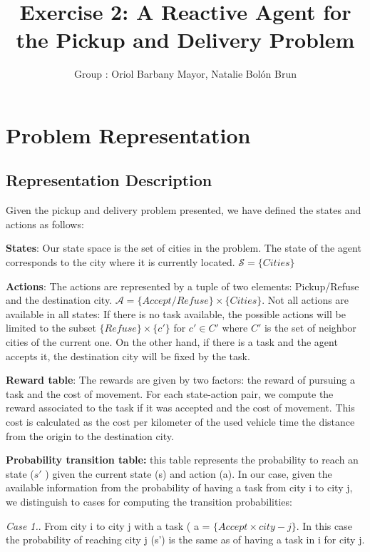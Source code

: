 \documentclass[11pt]{article}
\title{\bf Exercise 2: A Reactive Agent for the Pickup and Delivery Problem}
\author{Group \textnumero 54: Oriol Barbany Mayor, Natalie Bolón Brun}
\begin{document}
\maketitle

\section{Problem Representation}

\subsection{Representation Description}
 Given the pickup and delivery problem presented, we have defined the states and actions as follows: 
 
\textbf{States}: Our state space is the set of cities in the problem. The state of the agent corresponds to the city where it is currently located. $\mathcal{S} = \{ Cities \} $

\textbf{Actions}: The actions are represented by a tuple of two elements: Pickup/Refuse and the destination city.  $\mathcal{A} = \{Accept/Refuse\} \times \{ Cities \} $. Not all actions are available in all states: If there is no task available, the possible actions will be limited to the subset $\{Refuse\} \times \{c'\}$ for  $c' \in C'$ where $C'$ is the set of neighbor cities of the current one. On the other hand, if there is a task and the agent accepts it, the destination city will be fixed by the task. 

\textbf{Reward table}: The rewards are given by two factors: the reward of pursuing a task and the cost of movement. For each state-action pair, we compute the reward associated to the task if it was accepted and the cost of movement. This cost is calculated as the cost per kilometer of the used vehicle time the distance from the origin to the destination city. %

\textbf{Probability transition table:} this table represents the probability to reach an state ($s'$
) given the current state (s) and action (a). In our case, given the available information from the probability of having a task from city i to city j, we distinguish to cases for computing the transition probabilities: 


\textit{Case 1.}. From city i to city j with a task ( a = $\{Accept \times city-j \}$. In this case the probability of reaching city j (s') is the same as of having a task in i for city j. 
\end{document}
